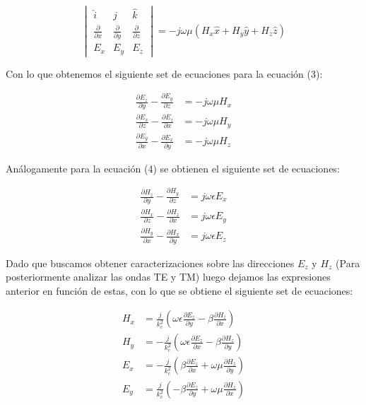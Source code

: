 \documentclass[
  11pt,
  letterpaper,
   addpoints,
   answers
  ]{exam}
\begin{document}
\begin{questions}
\begin{solution}
\begin{equation}
    \begin{vmatrix}
        \hat{i} & \hat{j} & \hat{k} \\
        \frac{\partial}{\partial x} & \frac{\partial}{\partial y} & \frac{\partial}{\partial z} \\
        E_x & E_y & E_z
    \end{vmatrix}
    = -j\omega\mu (H_x\hat{x} + H_y\hat{y} + H_z\hat{z})
    \tag{5}
\end{equation}

Con lo que obtenemos el siguiente set de ecuaciones para la ecuación (3):

\begin{align}
    \frac{\partial E_z}{\partial y} - \frac{\partial E_y}{\partial z} &= -j\omega\mu H_x \tag{6} \\
    \frac{\partial E_x}{\partial z} - \frac{\partial E_z}{\partial x} &= -j\omega\mu H_y \tag{7} \\
    \frac{\partial E_y}{\partial x} - \frac{\partial E_x}{\partial y} &= -j\omega\mu H_z \tag{8}
\end{align}

Análogamente para la ecuación (4) se obtienen el siguiente set de ecuaciones:

\begin{align}
    \frac{\partial H_z}{\partial y} - \frac{\partial H_y}{\partial z} &= j\omega\epsilon E_x \tag{9} \\
    \frac{\partial H_x}{\partial z} - \frac{\partial H_z}{\partial x} &= j\omega\epsilon E_y \tag{10} \\
    \frac{\partial H_y}{\partial x} - \frac{\partial H_x}{\partial y} &= j\omega\epsilon E_z \tag{11}
\end{align}

Dado que buscamos obtener caracterizaciones sobre las direcciones $E_z$ y $H_z$ (Para posteriormente analizar las ondas TE y TM) luego dejamos las expresiones anterior en función de estas, con lo que se obtiene el siguiente set de ecuaciones:

\begin{align}
    H_x &= \frac{j}{k_c^2} \left(\omega\epsilon \frac{\partial E_z}{\partial y} - \beta \frac{\partial H_z}{\partial x} \right) \tag{12}\\
    H_y &= -\frac{j}{k_c^2} \left(\omega\epsilon \frac{\partial E_z}{\partial x} - \beta \frac{\partial H_z}{\partial y} \right) \tag{13}\\
    E_x &= -\frac{j}{k_c^2} \left( \beta \frac{\partial E_z}{\partial x} + \omega\mu \frac{\partial H_z}{\partial y} \right) \tag{14}\\
    E_y &= \frac{j}{k_c^2} \left( -\beta \frac{\partial E_z}{\partial y} + \omega\mu \frac{\partial H_z}{\partial x} \right) \tag{15}
\end{align}


\end{solution}
\end{questions}
\end{document}
